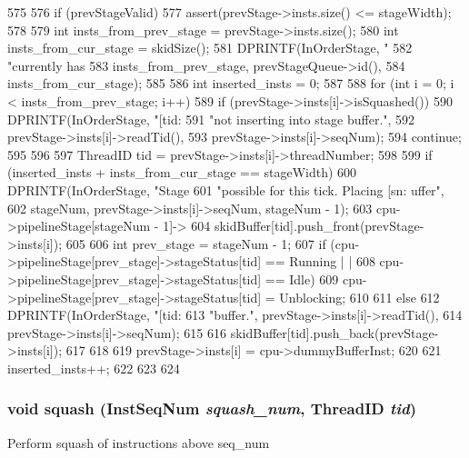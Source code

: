 \begin{DoxyCode}
575 {
576     if (prevStageValid) {
577         assert(prevStage->insts.size() <= stageWidth);
578 
579         int insts_from_prev_stage = prevStage->insts.size();
580         int insts_from_cur_stage = skidSize();
581         DPRINTF(InOrderStage, "%
582                 "currently has %
583                 insts_from_prev_stage, prevStageQueue->id(),
584                 insts_from_cur_stage);
585 
586         int inserted_insts = 0;
587 
588         for (int i = 0; i < insts_from_prev_stage; i++) {
589             if (prevStage->insts[i]->isSquashed()) {
590                 DPRINTF(InOrderStage, "[tid:%
591                         "not inserting into stage buffer.\n",
592                     prevStage->insts[i]->readTid(),
593                     prevStage->insts[i]->seqNum);
594                 continue;
595             }
596 
597             ThreadID tid = prevStage->insts[i]->threadNumber;
598 
599             if (inserted_insts + insts_from_cur_stage == stageWidth) {
600                DPRINTF(InOrderStage, "Stage %
601                        "possible for this tick. Placing [sn:%
      uffer\n",
602                        stageNum, prevStage->insts[i]->seqNum, stageNum - 1);
603                 cpu->pipelineStage[stageNum - 1]->
604                     skidBuffer[tid].push_front(prevStage->insts[i]);
605 
606                 int prev_stage = stageNum - 1;
607                 if (cpu->pipelineStage[prev_stage]->stageStatus[tid] == Running |
      |
608                     cpu->pipelineStage[prev_stage]->stageStatus[tid] == Idle) {
609                     cpu->pipelineStage[prev_stage]->stageStatus[tid] = 
      Unblocking;
610                 }
611             } else {
612                 DPRINTF(InOrderStage, "[tid:%
613                         "buffer.\n", prevStage->insts[i]->readTid(),
614                         prevStage->insts[i]->seqNum);
615 
616                 skidBuffer[tid].push_back(prevStage->insts[i]);
617             }
618 
619             prevStage->insts[i] = cpu->dummyBufferInst;
620 
621             inserted_insts++;
622         }
623     }
624 }
\end{DoxyCode}
\hypertarget{classPipelineStage_aee9dc23de90acd20200641407a3bd1da}{
\subsubsection[{squash}]{\setlength{\rightskip}{0pt plus 5cm}void squash ({\bf InstSeqNum} {\em squash\_\-num}, \/  {\bf ThreadID} {\em tid})}}
\label{classPipelineStage_aee9dc23de90acd20200641407a3bd1da}
Perform squash of instructions above seq\_\-num 

